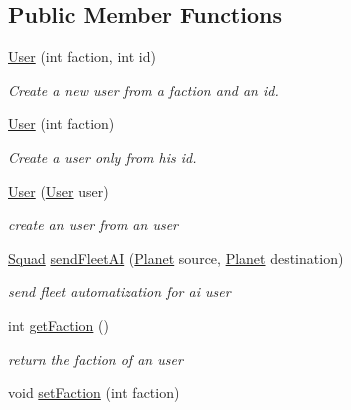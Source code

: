 \subsection*{Public Member Functions}
\begin{DoxyCompactItemize}
\item 
\hyperlink{classfr_1_1groupe40_1_1projet_1_1client_1_1_user_acd2d859d7679c886c0445aa8d18f177f}{User} (int faction, int id)
\begin{DoxyCompactList}\small\item\em Create a new user from a faction and an id. \end{DoxyCompactList}\item 
\hyperlink{classfr_1_1groupe40_1_1projet_1_1client_1_1_user_ae3f43ec29e7b599c4f203bc0fa9c5fd5}{User} (int faction)
\begin{DoxyCompactList}\small\item\em Create a user only from his id. \end{DoxyCompactList}\item 
\hyperlink{classfr_1_1groupe40_1_1projet_1_1client_1_1_user_aadb257aeb0ed9544df923a83f8ed1e61}{User} (\hyperlink{classfr_1_1groupe40_1_1projet_1_1client_1_1_user}{User} user)
\begin{DoxyCompactList}\small\item\em create an user from an user \end{DoxyCompactList}\item 
\hyperlink{classfr_1_1groupe40_1_1projet_1_1model_1_1ships_1_1_squad}{Squad} \hyperlink{classfr_1_1groupe40_1_1projet_1_1client_1_1_user_a32007a7692972de524c9a03c813b97d1}{send\+Fleet\+AI} (\hyperlink{classfr_1_1groupe40_1_1projet_1_1model_1_1planets_1_1_planet}{Planet} source, \hyperlink{classfr_1_1groupe40_1_1projet_1_1model_1_1planets_1_1_planet}{Planet} destination)
\begin{DoxyCompactList}\small\item\em send fleet automatization for ai user \end{DoxyCompactList}\item 
int \hyperlink{classfr_1_1groupe40_1_1projet_1_1client_1_1_user_a32446cf36b262fc03f5dc96a207a5375}{get\+Faction} ()
\begin{DoxyCompactList}\small\item\em return the faction of an user \end{DoxyCompactList}\item 
void \hyperlink{classfr_1_1groupe40_1_1projet_1_1client_1_1_user_af10956b4173a0bcd31fe89d450aa1cf1}{set\+Faction} (int faction)

\end{DoxyCompactItemize}

